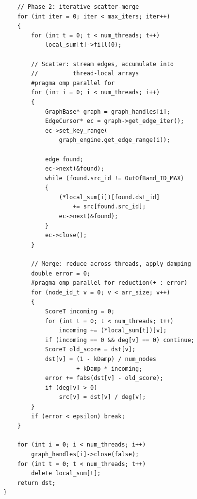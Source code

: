 \begin{lstlisting}
    // Phase 2: iterative scatter-merge
    for (int iter = 0; iter < max_iters; iter++)
    {
        for (int t = 0; t < num_threads; t++)
            local_sum[t]->fill(0);

        // Scatter: stream edges, accumulate into
        //          thread-local arrays
        #pragma omp parallel for
        for (int i = 0; i < num_threads; i++)
        {
            GraphBase* graph = graph_handles[i];
            EdgeCursor* ec = graph->get_edge_iter();
            ec->set_key_range(
                graph_engine.get_edge_range(i));

            edge found;
            ec->next(&found);
            while (found.src_id != OutOfBand_ID_MAX)
            {
                (*local_sum[i])[found.dst_id]
                    += src[found.src_id];
                ec->next(&found);
            }
            ec->close();
        }

        // Merge: reduce across threads, apply damping
        double error = 0;
        #pragma omp parallel for reduction(+ : error)
        for (node_id_t v = 0; v < arr_size; v++)
        {
            ScoreT incoming = 0;
            for (int t = 0; t < num_threads; t++)
                incoming += (*local_sum[t])[v];
            if (incoming == 0 && deg[v] == 0) continue;
            ScoreT old_score = dst[v];
            dst[v] = (1 - kDamp) / num_nodes
                     + kDamp * incoming;
            error += fabs(dst[v] - old_score);
            if (deg[v] > 0)
                src[v] = dst[v] / deg[v];
        }
        if (error < epsilon) break;
    }

    for (int i = 0; i < num_threads; i++)
        graph_handles[i]->close(false);
    for (int t = 0; t < num_threads; t++)
        delete local_sum[t];
    return dst;
}
\end{lstlisting}

